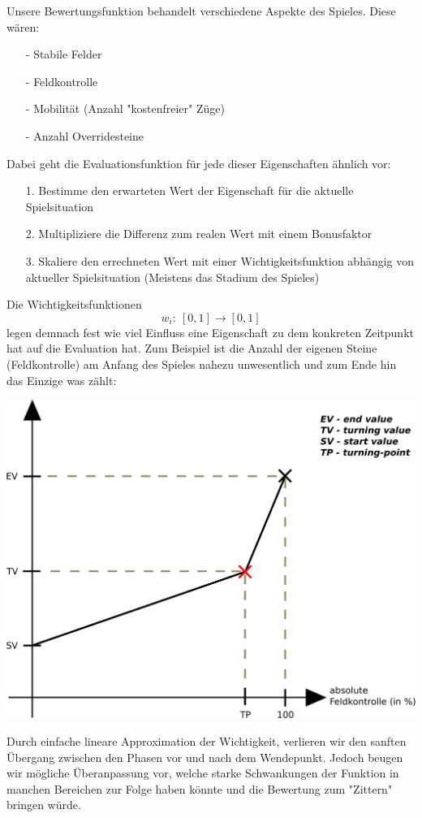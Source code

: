 \noindent
Unsere Bewertungsfunktion behandelt verschiedene Aspekte des Spieles. Diese wären:
\begin{enumerate}
\item[-] Stabile Felder
\item[-] Feldkontrolle
\item[-] Mobilität (Anzahl "kostenfreier" Züge)
\item[-] Anzahl Overridesteine
\end{enumerate}
Dabei geht die Evaluationsfunktion für jede dieser Eigenschaften ähnlich vor: 
\begin{enumerate}
\item[1.] Bestimme den erwarteten Wert der Eigenschaft für die aktuelle Spielsituation
\item[2.] Multipliziere die Differenz zum realen Wert mit einem Bonusfaktor
\item[3.] Skaliere den errechneten Wert mit einer Wichtigkeitsfunktion abhängig von aktueller Spielsituation (Meistens das Stadium des Spieles)
\end{enumerate}
Die Wichtigkeitsfunktionen $$w_i:\ [0,1] \rightarrow [0,1]$$ legen demnach fest wie viel Einfluss eine Eigenschaft zu dem konkreten Zeitpunkt hat auf die Evaluation hat. Zum Beispiel ist die Anzahl der eigenen Steine (Feldkontrolle) am Anfang des Spieles nahezu unwesentlich und zum Ende hin das Einzige was zählt:
\begin{center}
\includegraphics[scale=0.15]{ImportanceFunctionGraph.pdf}
\end{center}
Durch einfache lineare Approximation der Wichtigkeit, verlieren wir den sanften Übergang zwischen den Phasen vor und nach dem Wendepunkt. Jedoch beugen wir mögliche Überanpassung vor, welche starke Schwankungen der Funktion in manchen Bereichen zur Folge haben könnte und die Bewertung zum "Zittern" bringen würde.\\
